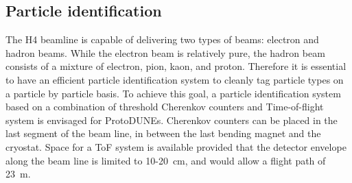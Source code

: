 \subsection{Particle identification}
The H4 beamline is capable of delivering two types of beams: electron and hadron beams. While the electron beam is relatively pure, the hadron beam consists of a mixture of electron, pion, kaon, and proton. Therefore it is essential to have an efficient particle identification system to cleanly tag particle types on a particle by particle basis. To achieve this goal, a particle identification system based on a combination of threshold Cherenkov counters and Time-of-flight system is envisaged for ProtoDUNEs. 
Cherenkov counters can be placed in the last segment of the beam line, in between the last bending magnet and the cryostat. Space for a ToF system is available provided that the detector envelope along the beam line is limited to 10-20~cm,
and would allow a flight path of 23~m.

